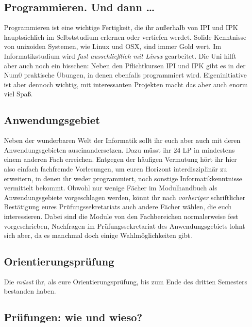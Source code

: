 \subsection{Programmieren. Und dann \dots}



Programmieren ist eine wichtige Fertigkeit, die ihr außerhalb von \gls{IPI} und \gls{IPK} hauptsächlich im Selbststudium erlernen oder vertiefen werdet. Solide Kenntnisse von unixoiden Systemen, wie Linux und OSX, sind immer Gold wert. Im Informatikstudium wird \emph{fast ausschließlich mit Linux} gearbeitet. Die Uni hilft aber auch noch ein bisschen: Neben den Pflichtkursen \gls{IPI} und \gls{IPK} gibt es in der \gls{Num0} praktische Übungen, in denen ebenfalls programmiert wird. Eigeninitiative ist aber dennoch wichtig, mit interessanten Projekten macht das aber auch enorm viel Spaß.


\subsection{Anwendungsgebiet}

Neben der wunderbaren Welt der Informatik sollt ihr euch aber auch mit deren Anwendungsgebieten auseinandersetzen. Dazu müsst ihr 24 \gls{LP} in mindestens einem anderen Fach erreichen. Entgegen der häufigen Vermutung hört ihr hier also einfach fachfremde Vorlesungen, um euren Horizont interdisziplinär zu erweitern, in denen ihr weder programmiert, noch sonstige Informatikkenntnisse vermittelt bekommt. Obwohl nur wenige Fächer im Modulhandbuch als Anwendungsgebiete vorgeschlagen werden, könnt ihr nach \emph{vorheriger} schriftlicher Bestätigung eures Prüfungssekretariats auch andere Fächer wählen, die euch interessieren. Dabei sind die Module von den Fachbereichen normalerweise fest vorgeschrieben, Nachfragen im Prüfungssekretariat des Anwendungsgebiets lohnt sich aber, da es manchmal doch einige Wahlmöglichkeiten gibt.


\subsection{Orientierungsprüfung}

Die  \emph{müsst} ihr, als eure Orientierungsprüfung, bis zum Ende des dritten Semesters bestanden haben.


\subsection{Prüfungen: wie und wieso?}


